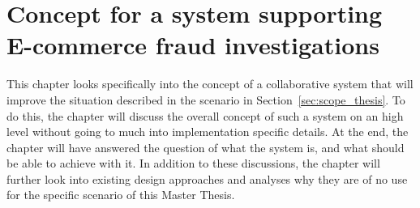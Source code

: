 
\chapter{Concept for a system supporting \gls{E-commerce} fraud investigations} %
\label{cha:system_concept}

This chapter looks specifically into the concept of a collaborative system that will improve the situation described in the scenario in Section~\ref{sec:scope_thesis}. To do this, the chapter will discuss the overall concept of such a system on an high level without going to much into implementation specific details. At the end, the chapter will have answered the question of what the system is, and what should be able to achieve with it. In addition to these discussions, the chapter will further look into existing design approaches and analyses why they are of no use for the specific scenario of this Master Thesis.











